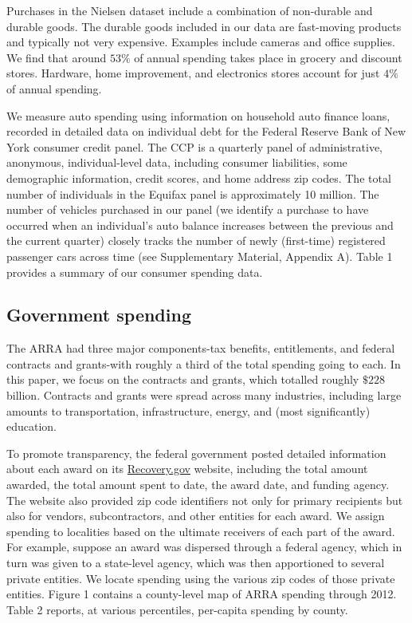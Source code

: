 \documentclass[\latexroot/\projectname]{subfiles}
\begin{document}
Purchases in the Nielsen dataset include a combination of non-durable and durable goods. The durable goods included in our data are fast-moving products and typically not very expensive. Examples include cameras and office supplies. We find that around $53 \%$ of annual spending takes place in grocery and discount stores. Hardware, home improvement, and electronics stores account for just $4 \%$ of annual spending.

We measure auto spending using information on household auto finance loans, recorded in detailed data on individual debt for the Federal Reserve Bank of New York consumer credit panel. The CCP is a quarterly panel of administrative, anonymous, individual-level data, including consumer liabilities, some demographic information, credit scores, and home address zip codes. The total number of individuals in the Equifax panel is approximately 10 million. The number of vehicles purchased in our panel (we identify a purchase to have occurred when an individual's auto balance increases between the previous and the current quarter) closely tracks the number of newly (first-time) registered passenger cars across time (see Supplementary Material, Appendix A). Table 1 provides a summary of our consumer spending data.

\subsection{Government spending}
The ARRA had three major components-tax benefits, entitlements, and federal contracts and grants-with roughly a third of the total spending going to each. In this paper, we focus on the contracts and grants, which totalled roughly $\$ 228$ billion. Contracts and grants were spread across many industries, including large amounts to transportation, infrastructure, energy, and (most significantly) education.





To promote transparency, the federal government posted detailed information about each award on its \href{http://Recovery.gov}{Recovery.gov} website, including the total amount awarded, the total amount spent to date, the award date, and funding agency. The website also provided zip code identifiers not only for primary recipients but also for vendors, subcontractors, and other entities for each award. We assign spending to localities based on the ultimate receivers of each part of the award. For example, suppose an award was dispersed through a federal agency, which in turn was given to a state-level agency, which was then apportioned to several private entities. We locate spending using the various zip codes of those private entities. Figure 1 contains a county-level map of ARRA spending through 2012. Table 2 reports, at various percentiles, per-capita spending by county.
\end{document}
